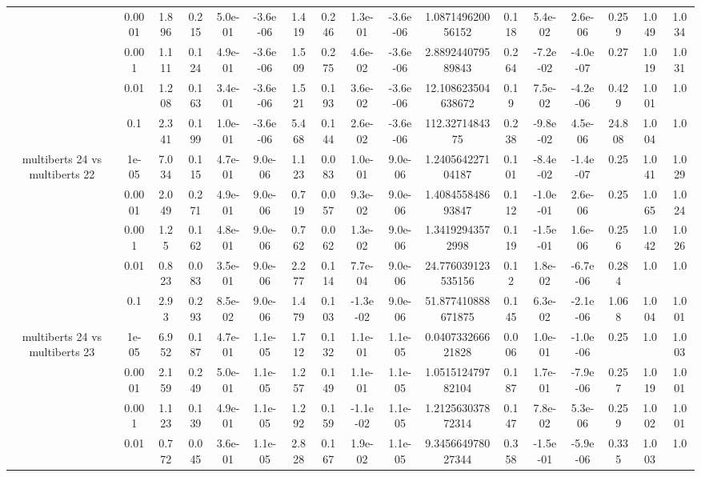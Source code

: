 \begin{tabular}{|c|c|c|c|c|c|c|c|c|c|c|c|c|c|c|c|c|}
 & 0.0001 & 1.896 & 0.215 & 5.0e-01 & -3.6e-06 & 1.419 & 0.246 & 1.3e-01 & -3.6e-06 & 1.087149620056152 & 0.118 & 5.4e-02 & 2.6e-06 & 0.259 & 1.049 & 1.034 \\
 & 0.001 & 1.111 & 0.124 & 4.9e-01 & -3.6e-06 & 1.509 & 0.275 & 4.6e-02 & -3.6e-06 & 2.889244079589843 & 0.264 & -7.2e-02 & -4.0e-07 & 0.27 & 1.019 & 1.031 \\
 & 0.01 & 1.208 & 0.163 & 3.4e-01 & -3.6e-06 & 1.521 & 0.193 & 3.6e-02 & -3.6e-06 & 12.108623504638672 & 0.19 & 7.5e-02 & -4.2e-06 & 0.429 & 1.001 & 1.0 \\
 & 0.1 & 2.341 & 0.199 & 1.0e-01 & -3.6e-06 & 5.468 & 0.144 & 2.6e-02 & -3.6e-06 & 112.3271484375 & 0.238 & -9.8e-02 & 4.5e-06 & 24.808 & 1.004 & 1.0 \\
\hline
\multirow{5}{*}{multiberts 24 vs multiberts 22} & 1e-05 & 7.034 & 0.115 & 4.7e-01 & 9.0e-06 & 1.123 & 0.083 & 1.0e-01 & 9.0e-06 & 1.240564227104187 & 0.101 & -8.4e-02 & -1.4e-07 & 0.25 & 1.041 & 1.029 \\
 & 0.0001 & 2.049 & 0.271 & 4.9e-01 & 9.0e-06 & 0.719 & 0.057 & 9.3e-02 & 9.0e-06 & 1.408455848693847 & 0.112 & -1.0e-01 & 2.6e-06 & 0.25 & 1.065 & 1.024 \\
 & 0.001 & 1.25 & 0.162 & 4.8e-01 & 9.0e-06 & 0.762 & 0.062 & 1.3e-02 & 9.0e-06 & 1.34192943572998 & 0.119 & -1.5e-01 & 1.6e-06 & 0.256 & 1.042 & 1.026 \\
 & 0.01 & 0.823 & 0.083 & 3.5e-01 & 9.0e-06 & 2.277 & 0.114 & 7.7e-04 & 9.0e-06 & 24.776039123535156 & 0.12 & 1.8e-02 & -6.7e-06 & 0.284 & 1.0 & 1.0 \\
 & 0.1 & 2.93 & 0.293 & 8.5e-02 & 9.0e-06 & 1.479 & 0.103 & -1.3e-02 & 9.0e-06 & 51.877410888671875 & 0.145 & 6.3e-02 & -2.1e-06 & 1.068 & 1.004 & 1.001 \\
\hline
\multirow{5}{*}{multiberts 24 vs multiberts 23} & 1e-05 & 6.952 & 0.187 & 4.7e-01 & 1.1e-05 & 1.712 & 0.132 & 1.1e-01 & 1.1e-05 & 0.040733266621828 & 0.006 & 1.0e-01 & -1.0e-06 & 0.25 & 1.0 & 1.003 \\
 & 0.0001 & 2.159 & 0.249 & 5.0e-01 & 1.1e-05 & 1.257 & 0.149 & 1.1e-01 & 1.1e-05 & 1.051512479782104 & 0.187 & 1.7e-01 & -7.9e-06 & 0.257 & 1.019 & 1.001 \\
 & 0.001 & 1.123 & 0.139 & 4.9e-01 & 1.1e-05 & 1.292 & 0.159 & -1.1e-02 & 1.1e-05 & 1.212563037872314 & 0.147 & 7.8e-02 & 5.3e-06 & 0.259 & 1.002 & 1.001 \\
 & 0.01 & 0.772 & 0.045 & 3.6e-01 & 1.1e-05 & 2.828 & 0.167 & 1.9e-02 & 1.1e-05 & 9.345664978027344 & 0.358 & -1.5e-01 & -5.9e-06 & 0.335 & 1.003 & 1.0 \\

\end{tabular}
